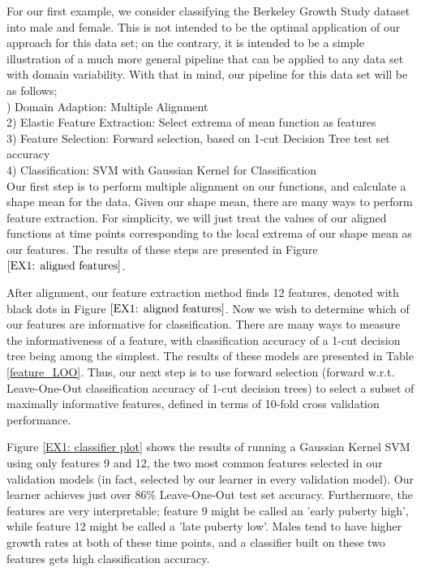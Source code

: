 \documentclass[]{article}
\begin{document}
For our first example, we consider classifying the Berkeley Growth Study dataset into male and female. This is not intended to be the optimal application of our approach for this data set; on the contrary, it is intended to be a simple illustration of a much more general pipeline that can be applied to any data set with domain variability. With that in mind, our pipeline for this data set will be as follows;\\

) Domain Adaption: Multiple Alignment\\
2) Elastic Feature Extraction: Select extrema of mean function as features\\
3) Feature Selection: Forward selection, based on 1-cut Decision Tree test set accuracy\\
4) Classification: SVM with Gaussian Kernel for Classification\\

Our first step is to perform multiple alignment on our functions, and calculate a shape mean for the data. Given our shape mean, there are many ways to perform feature extraction. For simplicity, we will just treat the values of our aligned functions at time points corresponding to the local extrema of our shape mean as our features. The results of these steps are presented in Figure $\ref{EX1: aligned features}$. 

After alignment, our feature extraction method finds 12 features, denoted with black dots in Figure $\ref{EX1: aligned features}$. Now we wish to determine which of our features are informative for classification. There are many ways to measure the informativeness of a feature, with classification accuracy of a 1-cut decision tree being among the simplest. The results of these models are presented in Table \ref{feature_LOO}. Thus, our next step is to use forward selection (forward w.r.t. Leave-One-Out classification accuracy of 1-cut decision trees) to select a subset of maximally informative features, defined in terms of 10-fold cross validation performance.

Figure \ref{EX1: classifier plot} shows the results of running a Gaussian Kernel SVM using only features 9 and 12, the two most common features selected in our validation models (in fact, selected by our learner in every validation model). Our learner achieves just over 86\% Leave-One-Out test set accuracy. Furthermore, the features are very interpretable; feature 9 might be called an 'early puberty high', while feature 12 might be called a 'late puberty low'. Males tend to have higher growth rates at both of these time points, and a classifier built on these two features gets high classification accuracy.
\end{document}
